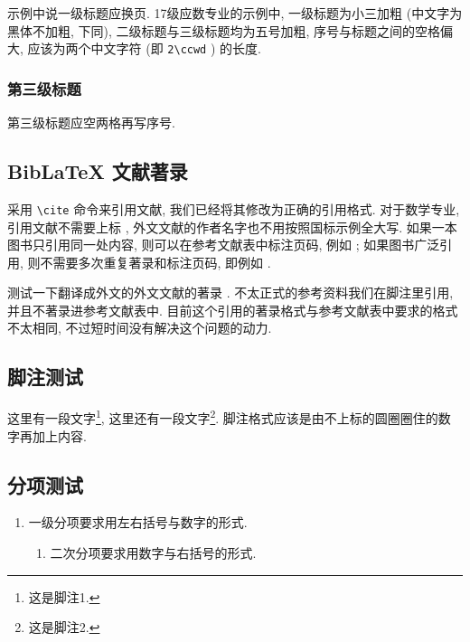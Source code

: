示例中说一级标题应换页. 17级应数专业的示例中, 一级标题为小三加粗 (中文字为黑体不加粗, 下同), 二级标题与三级标题均为五号加粗, 序号与标题之间的空格偏大, 应该为两个中文字符 (即 \verb|2\ccwd| ) 的长度.

\subsubsection{第三级标题}

第三级标题应空两格再写序号.

\zhlipsum[1]

\subsection{BibLaTeX 文献著录}

采用 \verb|\cite| 命令来引用文献, 我们已经将其修改为正确的引用格式. 对于数学专业, 引用文献不需要上标 \cite{atiyah_introduction_1969}, 外文文献的作者名字也不用按照国标示例全大写. 如果一本图书只引用同一处内容, 则可以在参考文献表中标注页码, 例如 \cite{herrlich_axiom_2006}; 如果图书广泛引用, 则不需要多次重复著录和标注页码, 即例如 \cite{atiyah_introduction_1969}.






测试一下翻译成外文的外文文献的著录 \cite{sally_history_1985}. 不太正式的参考资料我们在脚注里引用, 并且不著录进参考文献表中. 目前这个引用的著录格式与参考文献表中要求的格式不太相同, 不过短时间没有解决这个问题的动力.

\zhlipsum[1]

\subsection{脚注测试}

这里有一段文字\footnote{这是脚注1.}, 这里还有一段文字\footnote{这是脚注2.}. 脚注格式应该是由不上标的圆圈圈住的数字再加上内容.

\zhlipsum

\subsection{分项测试}

\begin{enumerate}
  \item 一级分项要求用左右括号与数字的形式.
  \begin{enumerate}
    \item 二次分项要求用数字与右括号的形式.
  \end{enumerate}
\end{enumerate}

\zhlipsum[1]
